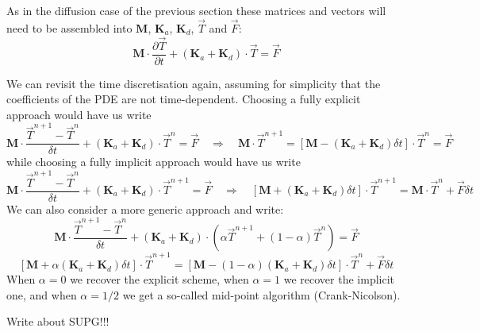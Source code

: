 As in the diffusion case of the previous section these matrices and vectors will need to be 
assembled into ${\bm M}$, ${\bm K}_a$, ${\bm K}_d$, $\vec{T}$ and $\vec{F}$:
\[
{\bm M} \cdot \frac{\partial {\vec T}}{\partial t} + ({\bm K}_a + {\bm K}_d) \cdot {\vec T} = {\vec F}
\]

We can revisit the time discretisation again, assuming for simplicity that the coefficients of the PDE are not time-dependent.
Choosing a fully explicit approach would have us write
\[
{\bm M} \cdot \frac{{\vec T}^{n+1}-{\vec T}^n}{\delta t} + ({\bm K}_a + {\bm K}_d) \cdot {\vec T}^{n} = {\vec F}
\quad
\Rightarrow
\quad
{\bm M} \cdot {\vec T}^{n+1} = [{\bm M} - ({\bm K}_a + {\bm K}_d) \delta t] \cdot {\vec T}^{n} = {\vec F}
\]
while choosing a fully implicit approach would have us write
\[
{\bm M} \cdot \frac{{\vec T}^{n+1}-{\vec T}^n}{\delta t} + ({\bm K}_a + {\bm K}_d) \cdot {\vec T}^{n+1} = {\vec F}
\quad
\Rightarrow
\quad
[{\bm M} +  ({\bm K}_a + {\bm K}_d) \delta t] \cdot {\vec T}^{n+1}
={\bm M}\cdot {\vec T}^n+ {\vec F} \delta t
\]
We can also consider a more generic approach and write:
\[
{\bm M} \cdot \frac{{\vec T}^{n+1}-{\vec T}^n}{\delta t} + ({\bm K}_a + {\bm K}_d) \cdot (\alpha {\vec T}^{n+1}+(1-\alpha)\vec{T}^{n}) = {\vec F}
\]
\[
[{\bm M} +  \alpha({\bm K}_a + {\bm K}_d) \delta t] \cdot {\vec T}^{n+1}
=
[{\bm M} - (1-\alpha)({\bm K}_a + {\bm K}_d) \delta t] \cdot {\vec T}^{n} + {\vec F}\delta t
\]
When $\alpha=0$ we recover the explicit scheme, when $\alpha=1$ we recover the implicit one, and when $\alpha=1/2$ we get a so-called 
mid-point algorithm (Crank-Nicolson).

Write about SUPG!!!

